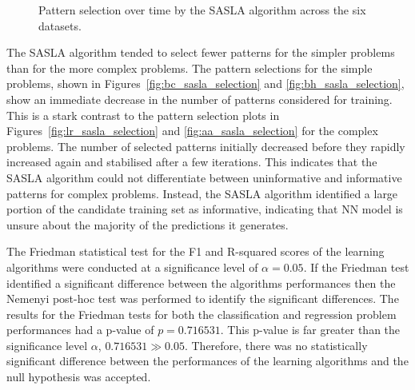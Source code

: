 \documentclass[conference]{IEEEtran}
\begin{document}
\begin{figure}[htbp]
		\hfil
		\caption{Pattern selection over time by the SASLA algorithm across the six datasets.}
		\label{fig:sasla_selection_all}
	\end{figure}
	
	The SASLA algorithm tended to select fewer patterns for the simpler problems than for the more complex problems. The pattern selections for the simple problems, shown in Figures~\ref{fig:bc_sasla_selection} and \ref{fig:bh_sasla_selection}, show an immediate decrease in the number of patterns considered for training. This is a stark contrast to the pattern selection plots in Figures~\ref{fig:lr_sasla_selection} and \ref{fig:aa_sasla_selection} for the complex problems. The number of selected patterns initially decreased before they rapidly increased again and stabilised after a few iterations. This indicates that the SASLA algorithm could not differentiate between uninformative and informative patterns for complex problems. Instead, the SASLA algorithm identified a large portion of the candidate training set as informative, indicating that NN model is unsure about the majority of the predictions it generates.
	
	The Friedman statistical test for the F1 and R-squared scores of the learning algorithms were conducted at a significance level of $\alpha=0.05$. If the Friedman test identified a significant difference between the algorithms performances then the Nemenyi post-hoc test was performed to identify the significant differences. The results for the Friedman tests for both the classification and regression problem performances had a p-value of $p=0.716531$. This p-value is far greater than the significance level $\alpha$, $0.716531 \gg 0.05$. Therefore, there was no statistically significant difference between the performances of the learning algorithms and the null hypothesis was accepted. 
	
\end{document}
